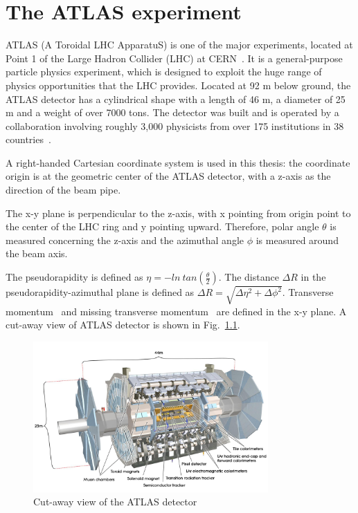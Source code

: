 \chapter{The ATLAS experiment}

\label{ch:atlas}
\par ATLAS (A Toroidal LHC ApparatuS) is one of the major experiments, located at Point 1 of the Large Hadron Collider (LHC) at CERN~\cite{Aad:2008zzm}. It is a general-purpose particle physics experiment, which is designed to exploit the huge range of physics opportunities that the LHC provides. Located at 92 m below ground, the ATLAS detector has a cylindrical shape with a length of 46 m, a diameter of 25 m and a weight of over 7000 tons.
 The detector was built and is operated by a collaboration involving roughly 3,000 physicists from over 175 institutions in 38 countries~\cite{fact}.

\par A right-handed Cartesian coordinate system is used in this thesis: the coordinate origin is at the geometric center of the ATLAS detector, with a z-axis as the direction of the beam pipe.

\par The x-y plane is perpendicular to the z-axis, with x pointing from origin point to the center of the LHC ring and y pointing upward. Therefore, polar angle $\theta$ is measured concerning the z-axis and the azimuthal angle $\phi$ is measured around the beam axis. 

\par The pseudorapidity is defined as $\eta = -ln~tan(\frac{\theta}{2})$. The distance $\Delta R$ in the pseudorapidity-azimuthal plane is defined as $\Delta R = \sqrt{\Delta\eta^2 + \Delta\phi^2}$. Transverse momentum \pt~and missing transverse momentum \met~are defined in the x-y plane. A cut-away view of ATLAS detector is shown in Fig.~\ref{fig:cutaway}.

\begin{figure}[htbp]
    \centering
    \includegraphics[width=0.8\textwidth]{chapters/c4/figures/atlas.jpg}
    \caption{Cut-away view of the ATLAS detector}
    \label{fig:cutaway}
\end{figure}

